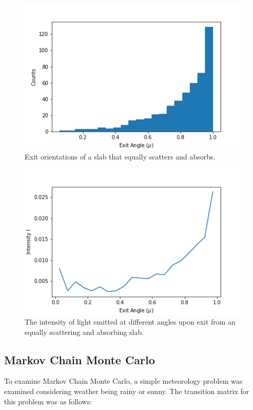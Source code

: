 \documentclass[twocolumn]{article}
\begin{document}
\begin{figure}
\centering
\includegraphics[width=\linewidth]{fig11}
\caption{Exit orientations of a slab that equally scatters and absorbs.}
\label{fig:fig11}
\end{figure}

\begin{figure}
\centering
\includegraphics[width=\linewidth]{fig12}
\caption{The intensity of light emitted at different angles upon exit from an equally scattering and absorbing slab.}
\label{fig:fig12}
\end{figure}


\subsection{Markov Chain Monte Carlo}
To examine Markov Chain Monte Carlo, a simple meteorology problem was examined considering weather being rainy or sunny. The transition matrix for this problem was as follows:
\end{document}
